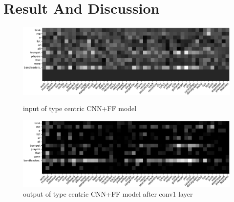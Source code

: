 \section{Result And Discussion}
\begin{figure}
	\includegraphics[width=\textwidth]{leaders_in_cropped.pdf} \caption{input of type centric CNN+FF model}\label{conv1Input}
	\includegraphics[width=\textwidth]{leaders_conv1_cropped.pdf}
	\caption{output of type centric CNN+FF model after conv1 layer}\label{conv1Output}

\end{figure}


